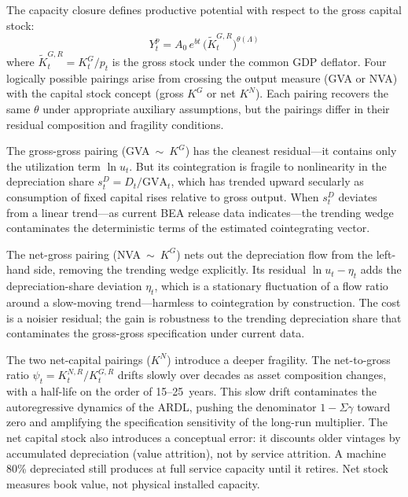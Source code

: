 \documentclass[11pt,a4paper]{article}
\begin{document}
The capacity closure defines productive potential with respect to the gross capital stock:
%
\begin{equation}
	\label{eq:capacity_closure}
	Y_t^p = A_0\, e^{bt}\, \bigl(\tilde{K}_t^{G,R}\bigr)^{\theta(\Lambda)}
\end{equation}
%
where $\tilde{K}_t^{G,R} = K_t^G / p_t$ is the gross stock under the common GDP deflator. Four logically possible pairings arise from crossing the output measure (GVA or NVA) with the capital stock concept (gross $K^G$ or net $K^N$). Each pairing recovers the same $\theta$ under appropriate auxiliary assumptions, but the pairings differ in their residual composition and fragility conditions.

The gross-gross pairing (GVA~$\sim$~$K^G$) has the cleanest residual---it contains only the utilization term $\ln u_t$. But its cointegration is fragile to nonlinearity in the depreciation share $s_t^D = D_t / \text{GVA}_t$, which has trended upward secularly as consumption of fixed capital rises relative to gross output. When $s_t^D$ deviates from a linear trend---as current BEA release data indicates---the trending wedge contaminates the deterministic terms of the estimated cointegrating vector.

The net-gross pairing (NVA~$\sim$~$K^G$) nets out the depreciation flow from the left-hand side, removing the trending wedge explicitly. Its residual $\ln u_t - \eta_t$ adds the depreciation-share deviation $\eta_t$, which is a stationary fluctuation of a flow ratio around a slow-moving trend---harmless to cointegration by construction. The cost is a noisier residual; the gain is robustness to the trending depreciation share that contaminates the gross-gross specification under current data.

The two net-capital pairings ($K^N$) introduce a deeper fragility. The net-to-gross ratio $\psi_t = K_t^{N,R} / K_t^{G,R}$ drifts slowly over decades as asset composition changes, with a half-life on the order of 15--25~years. This slow drift contaminates the autoregressive dynamics of the ARDL, pushing the denominator $1 - \Sigma\gamma$ toward zero and amplifying the specification sensitivity of the long-run multiplier. The net capital stock also introduces a conceptual error: it discounts older vintages by accumulated depreciation (value attrition), not by service attrition. A machine 80\% depreciated still produces at full service capacity until it retires. Net stock measures book value, not physical installed capacity.
\end{document}
